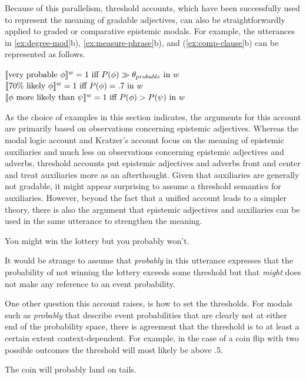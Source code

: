 \noindent Because of this parallelism, threshold accounts, which have been successfully used to represent the meaning of gradable adjectives,
can also be straightforwardly applied to graded or comparative epistemic modals. For example, the utterances in \ref{ex:degree-mod}b), 
\ref{ex:measure-phrase}b), and (\ref{ex:comp-clause}b)
can be represented as follows.

\begin{exe}
\ex $\llbracket\mbox{very probable } \phi\rrbracket^w = 1 \mbox{ iff $P(\phi) \gg \theta_{probable}$ in $w$}$
\ex$ \llbracket\mbox{70\% likely } \phi\rrbracket^w = 1 \mbox{ iff $P(\phi) = .7$  in $w$}$
 \ex$ \llbracket\phi \mbox{ more likely than } \psi\rrbracket^w = 1 \mbox{ iff $P(\phi) > P(\psi) $  in $w$}$
\end{exe}

As the choice of examples in this section indicates, the arguments for this account are primarily
based on observations concerning epistemic adjectives. Whereas the modal logic account and Kratzer's
account focus on the meaning of epistemic auxiliaries and much less on observations concerning
epistemic adjectives and adverbs, threshold accounts put epistemic adjectives and adverbs front and center
and treat auxiliaries more as an afterthought. Given that auxiliaries are generally not gradable, it
might appear surprising to assume a threshold semantics for auxiliaries. However, beyond the fact
that a unified account leads to a simpler theory, there is also the argument that 
epistemic adjectives and auxiliaries can be used in the same 
utterance to strengthen the meaning.

\begin{exe}
\ex You might win the lottery but you probably won't.
\end{exe}

\noindent It would be strange to assume that \textit{probably} in this utterance expresses
that the probability of not winning the lottery exceeds some threshold but that \textit{might}
does not make any reference to an event probability.

One other question this account raises, is how to set the thresholds. For modals such as \textit{probably} that describe
event probabilities that are clearly not at either end of the probability space, there is agreement that the threshold is
to at least a certain extent context-dependent. For example, in the case of a coin flip with two possible outcomes
the threshold will most likely be above .5.

\begin{exe}
\ex The coin will probably land on tails.
\end{exe}

